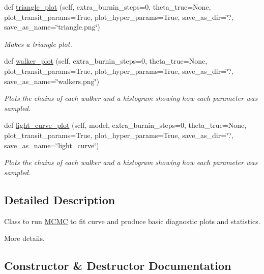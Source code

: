 \begin{DoxyCompactItemize}
def \hyperlink{classexospec_1_1mcmc_1_1_m_c_m_c_af240e8deac4470da704239926ea56822}{triangle\+\_\+plot} (self, extra\+\_\+burnin\+\_\+steps=0, theta\+\_\+true=None, plot\+\_\+transit\+\_\+params=True, plot\+\_\+hyper\+\_\+params=True, save\+\_\+as\+\_\+dir=\char`\"{}.\char`\"{}, save\+\_\+as\+\_\+name=\char`\"{}triangle.\+png\char`\"{})
\begin{DoxyCompactList}\small\item\em Makes a triangle plot. \end{DoxyCompactList}\item 
def \hyperlink{classexospec_1_1mcmc_1_1_m_c_m_c_a741c2882baef53c1fa19b2c086ec8261}{walker\+\_\+plot} (self, extra\+\_\+burnin\+\_\+steps=0, theta\+\_\+true=None, plot\+\_\+transit\+\_\+params=True, plot\+\_\+hyper\+\_\+params=True, save\+\_\+as\+\_\+dir=\char`\"{}.\char`\"{}, save\+\_\+as\+\_\+name=\char`\"{}walkers.\+png\char`\"{})
\begin{DoxyCompactList}\small\item\em Plots the chains of each walker and a histogram showing how each parameter was sampled. \end{DoxyCompactList}\item 
def \hyperlink{classexospec_1_1mcmc_1_1_m_c_m_c_ab2c5cc870e2b384534404f3bc667e039}{light\+\_\+curve\+\_\+plot} (self, model, extra\+\_\+burnin\+\_\+steps=0, theta\+\_\+true=None, plot\+\_\+transit\+\_\+params=True, plot\+\_\+hyper\+\_\+params=True, save\+\_\+as\+\_\+dir=\char`\"{}.\char`\"{}, save\+\_\+as\+\_\+name=\char`\"{}light\+\_\+curve\char`\"{})
\begin{DoxyCompactList}\small\item\em Plots the chains of each walker and a histogram showing how each parameter was sampled. \end{DoxyCompactList}\end{DoxyCompactItemize}


\subsection{Detailed Description}
Class to run \hyperlink{classexospec_1_1mcmc_1_1_m_c_m_c}{M\+C\+MC} to fit curve and produce basic diagnostic plots and statistics. 

More details. 

\subsection{Constructor \& Destructor Documentation}
\mbox{\label{classexospec_1_1mcmc_1_1_m_c_m_c_aae17f42d9fa567e61df69f7c808aa931}} 

